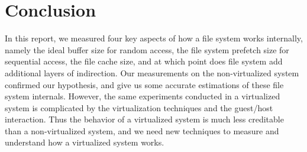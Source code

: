 \section{Conclusion}
\label{section:conclusion}

In this report, we measured four key aspects of how a file system works internally, namely the ideal buffer size for random access, the file system prefetch size for sequential access, the file cache size, and at which point does file system add additional layers of indirection. Our measurements on the non-virtualized system confirmed our hypothesis, and give us some accurate estimations of these file system internals. However, the same experiments conducted in a virtualized system is complicated by the virtualization techniques and the guest/host interaction. Thus the behavior of a virtualized system is much less creditable than a non-virtualized system, and we need new techniques to measure and understand how a virtualized system works.
